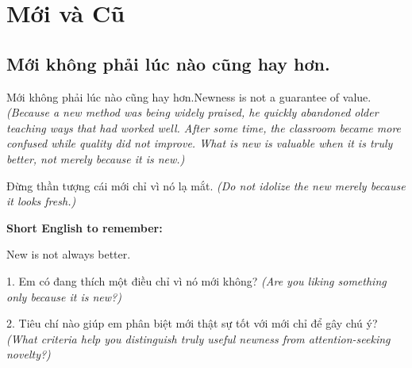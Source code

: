 \chapter{Mới và Cũ}

\section{Mới không phải lúc nào cũng hay hơn.}
\begin{truyen}{Mới không phải lúc nào cũng hay hơn.}{Newness is not a guarantee of value.}
\textit{(Because a new method was being widely praised, he quickly abandoned older teaching ways that had worked well. After some time, the classroom became more confused while quality did not improve. What is new is valuable when it is truly better, not merely because it is new.)}
\end{truyen}
\begin{baihoc}
Đừng thần tượng cái mới chỉ vì nó lạ mắt.
\textit{(Do not idolize the new merely because it looks fresh.)}
\end{baihoc}
\begin{ghinhoanh}
\textbf{Short English to remember:}

New is not always better.
\end{ghinhoanh}
\begin{tuhocnhanh}
1. Em có đang thích một điều chỉ vì nó mới không? \textit{(Are you liking something only because it is new?)}

2. Tiêu chí nào giúp em phân biệt mới thật sự tốt với mới chỉ để gây chú ý? \textit{(What criteria help you distinguish truly useful newness from attention-seeking novelty?)}
\end{tuhocnhanh}
\ngancach

